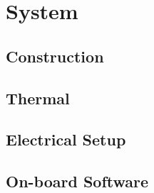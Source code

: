 \documentclass[11pt, aspectratio=169]{beamer}
\begin{document}
\section{System}
\subsection{Construction}
\subsection{Thermal}
\subsection{Electrical Setup}
\subsection{On-board Software}
\end{document}
